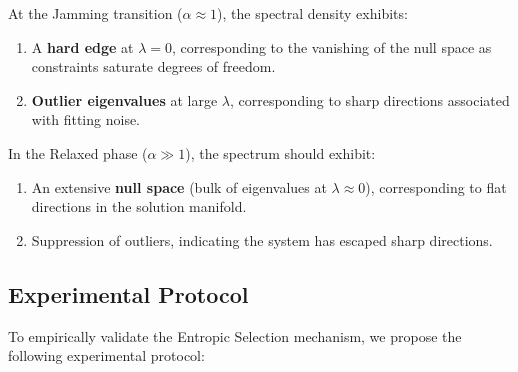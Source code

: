 \documentclass[
  journal=largetwo,
  year=2025,
  volume=37,
]{cup-journal}
\begin{document}
\begin{hypothesis}
At the Jamming transition ($\alpha \approx 1$), the spectral density exhibits:
\begin{enumerate}
    \item A \textbf{hard edge} at $\lambda = 0$, corresponding to the vanishing of the null space as constraints saturate degrees of freedom.
    \item \textbf{Outlier eigenvalues} at large $\lambda$, corresponding to sharp directions associated with fitting noise.
\end{enumerate}
In the Relaxed phase ($\alpha \gg 1$), the spectrum should exhibit:
\begin{enumerate}
    \item An extensive \textbf{null space} (bulk of eigenvalues at $\lambda \approx 0$), corresponding to flat directions in the solution manifold.
    \item Suppression of outliers, indicating the system has escaped sharp directions.
\end{enumerate}
\end{hypothesis}

\subsection{Experimental Protocol}

To empirically validate the Entropic Selection mechanism, we propose the following experimental protocol:

\begin{algorithm}[htb]
\renewcommand{\algorithmcfname}{Experimental Protocol}
\caption{NESP Validation via Teacher-Student Model}
\end{algorithm}
\end{document}
